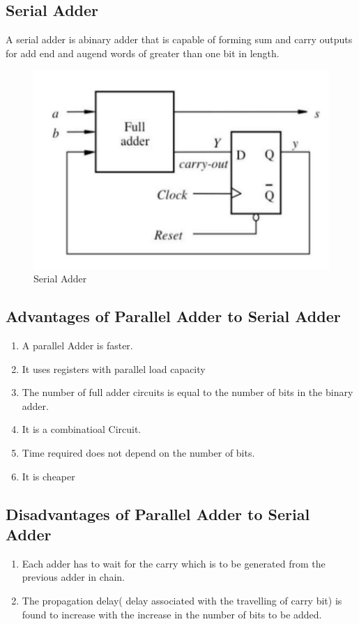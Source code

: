 \documentclass[11pt]{article}
\begin{document}
\subsection{Serial Adder}
A serial adder is abinary adder that is capable of forming sum and carry outputs for add end and augend words of greater than one bit in length. 
\begin{figure}[H]
\centering
\includegraphics[scale=0.4]{serial adder.png}
\caption{Serial Adder}
\end{figure}
\subsection{Advantages of Parallel Adder to Serial Adder}
\begin{enumerate}
	\item A parallel Adder is faster.
	\item It uses registers with parallel load capacity
	\item The number of full adder circuits is equal to the number of bits in the binary adder. 
	\item It is a combinatioal Circuit. 
	\item Time required does not depend on the number of bits. 
	\item It is cheaper
\end{enumerate}
\subsection{Disadvantages of Parallel Adder to Serial Adder}
\begin{enumerate}
	\item Each adder has to wait for the carry which is to be generated from the previous
	adder in chain.
	\item The propagation delay( delay associated with the travelling of carry bit) is found to
	increase with the increase in the number of bits to be added.
\end{enumerate}
\end{document}
